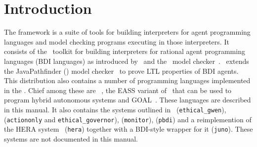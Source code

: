 \chapter{Introduction}

\begin{sloppypar}
The \mcapl{} framework is a suite of tools for building interpreters
for agent programming languages and  model checking programs
executing in those interpreters.  It consists of the \ail\ toolkit for building interpreters for rational agent programming languages (BDI languages) as introduced by~\cite{rao:92a} and the \ajpf\ model checker~\cite{MCAPL_journal}.  \ajpf\ extends the JavaPathfinder (\jpf) model checker~\cite{VisserHBPL03} to prove LTL properties of BDI agents.  This distribution also contains a number of programming languages implemented in the \ail.  Chief among these are \gwendolen~\cite{dennis17gwen}, the EASS variant of \gwendolen\ that can be used to program hybrid autonomous systems and GOAL~\cite{GOAL01}.  These languages are described in this manual.  It also contains the systems outlined in~\cite{Dennis2015} (\texttt{ethical\_gwen}), \cite{dennis15:_towar_verif_ethic_robot_behav} (\texttt{actiononly} and \texttt{ethical\_governor}), \cite{ferrando18} (\texttt{monitor}), \cite{bremner19} (\texttt{pbdi}) and a reimplemention of the {\sc HERA} system~\cite{hera} (\texttt{hera}) together with a BDI-style wrapper for it (\texttt{juno}).  These systems are not documented in this manual.
\end{sloppypar}

